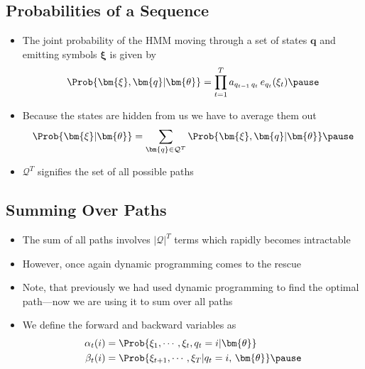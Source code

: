 
\begin{slide}
\section[-2]{Probabilities of a Sequence}

\begin{PauseHighLight}
  \begin{itemize}
  \item The joint probability of the HMM moving through a set of states
    $\bm{q}$ and emitting symbols $\bm{\xi}$ is given by
    \begin{align*}
      \Prob{\bm{\xi}, \bm{q} | \bm{\theta}} = \prod_{t=1}^T
      a_{q_{t-1}\,q_t}\,e_{q_t}(\xi_t)\pause
    \end{align*}
  \item Because the states are hidden from us we have to average them
    out
    \begin{align*}
      \Prob{\bm{\xi} | \bm{\theta}} = \sum_{\bm{q}\in\mathcal{Q}^T}
      \Prob{\bm{\xi}, \bm{q} | \bm{\theta}}\pause
    \end{align*}
  \item $\mathcal{Q}^T$ signifies the set of all possible paths\pause
  \end{itemize}
\end{PauseHighLight}

\end{slide}

\Outline %

\begin{slide}
\section{Summing Over Paths}

\begin{PauseHighLight}
  \begin{itemize}
  \item The sum of all paths involves $|\mathcal{Q}|^T$ terms which
    rapidly becomes intractable\pause
  \item However, once again dynamic programming comes to the
    rescue\pause
  \item Note, that previously we had used dynamic programming to find
    the optimal path---now we are using it to sum over all paths\pause
  \item We define the forward and backward variables as
    \begin{align*}
      \alpha_t(i) &= \Prob{\xi_1,\cdots,\xi_t, q_t = i|\bm{\theta}}\\
      \beta_t(i) &= \Prob{\xi_{t+1},\cdots,\xi_T | q_t =
                   i,\,\bm{\theta}} \pause
\end{align*}
  \end{itemize}
\end{PauseHighLight}

\end{slide}

